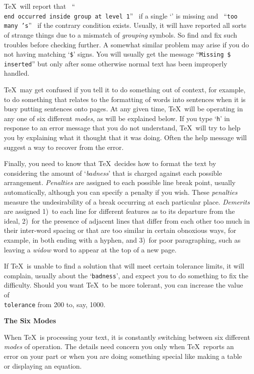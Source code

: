 \TeX\ will report that \ ``{\tt \\end occurred inside group at level 1}''
\ if a single `\rbr' is missing and \ ``{\tt too many \rbr's}'' \ if the
contrary condition exists. Usually, it will have reported all sorts of
strange things due to a mismatch of {\sl grouping} symbols.  So find and
fix such troubles before checking further.  A somewhat similar problem may
arise if you do not having matching `{\tt\$}' signs. You will usually get the
message ``{\tt Missing \$ inserted}'' but only after some otherwise normal
text has been improperly handled.

\TeX\ may get confused if you tell it to do something out of context, for
example, to do something that relates to the formatting of words into
sentences when it is busy putting sentences onto pages. 
 At any given time,
\TeX\ will be operating in any one of six different {\sl modes}, as will
be explained  below.
If you type `{\tt h}' in response to an error message that you do not
understand, \TeX\ will try to help you by explaining what it thought that it
was doing. Often the help message will suggest a way to recover from the error.

Finally, you need to know that
\TeX\ decides how to format the text by
considering the amount of `{\sl badness\/}' that is charged
against each possible arrangement. {\sl Penalties\/} are assigned to each
possible line break point, usually automatically, although you can specify
a penalty if you wish.  These {\sl penalties\/}
measure the undesirability of a break occurring at each particular place.
{\sl Demerits\/} are assigned  1)~to each line for different features as
to its departure from the ideal, 2)~for the presence of adjacent lines
that differ from each other too much in their inter-word spacing
or that
are too similar in certain obnoxious ways, for example, in both ending
with a hyphen, and 3)~for poor paragraphing, such as
leaving a {\sl widow\/} word to appear at the top of a new page.

If \TeX\ is unable to find a solution that will meet certain tolerance limits,
it will complain, usually about the `{\tt badness}', and
expect you to do something to fix the difficulty. Should you want \TeX\ to be more
tolerant, you can increase the value of {\tt \\tolerance} from 200 to, say, 1000.

{\bf The Six Modes}

When \TeX\ is processing your text, it is constantly switching between six
different {\sl modes} of operation.  The details need
concern you only when \TeX\ reports an error on your part
or when you are doing something special like making a table or
displaying an equation.

